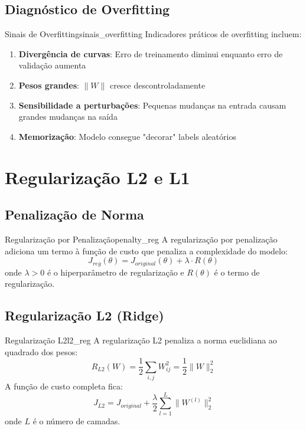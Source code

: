 \documentclass[a4paper,12pt]{article}
\begin{document}
\subsection{Diagnóstico de Overfitting}

\begin{observacao}{Sinais de Overfitting}{sinais_overfitting}
Indicadores práticos de overfitting incluem:
\begin{enumerate}
    \item \textbf{Divergência de curvas}: Erro de treinamento diminui enquanto erro de validação aumenta
    \item \textbf{Pesos grandes}: $\|W\|$ cresce descontroladamente
    \item \textbf{Sensibilidade a perturbações}: Pequenas mudanças na entrada causam grandes mudanças na saída
    \item \textbf{Memorização}: Modelo consegue "decorar" labels aleatórios
\end{enumerate}
\end{observacao}

\section{Regularização L2 e L1}

\subsection{Penalização de Norma}

\begin{definicao}{Regularização por Penalização}{penalty_reg}
A regularização por penalização adiciona um termo à função de custo que penaliza a complexidade do modelo:
\[
J_{reg}(\theta) = J_{original}(\theta) + \lambda \cdot R(\theta)
\]
onde $\lambda > 0$ é o hiperparâmetro de regularização e $R(\theta)$ é o termo de regularização.
\end{definicao}

\subsection{Regularização L2 (Ridge)}

\begin{definicao}{Regularização L2}{l2_reg}
A regularização L2 penaliza a norma euclidiana ao quadrado dos pesos:
\[
R_{L2}(W) = \frac{1}{2}\sum_{i,j} W_{ij}^2 = \frac{1}{2}\|W\|_2^2
\]
A função de custo completa fica:
\[
J_{L2} = J_{original} + \frac{\lambda}{2} \sum_{l=1}^{L} \|W^{(l)}\|_2^2
\]
onde $L$ é o número de camadas.
\end{definicao}
\end{document}
